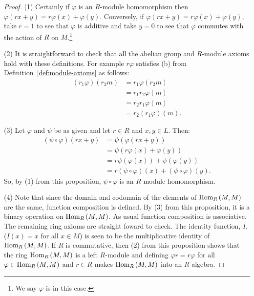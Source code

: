     \begin{proof}
        (1) Certainly if $\varphi$ is an $R$-module homomorphism then $\varphi(rx+y) = r\varphi(x) + \varphi(y)$. Conversely, if $\varphi(rx+y) = r\varphi(x) + \varphi(y)$, take $r = 1$ to see that $\varphi$ is additive and take $y = 0$ to see that $\varphi$ commutes with the action of $R$ on $M$.\footnote{We say $\varphi$ is  in this case.}

        (2) It is straightforward to check that all the abelian group and $R$-module axioms hold with these definitions. For example $r\varphi$ satisfies (b) from Definition~\ref{def:module-axioms} as follows:
            \begin{equation*}
            \begin{split}
                (r_1\varphi)(r_2 m)
                & = r_1 \varphi(r_2 m) \\
                & = r_1 r_2 \varphi(m) \\
                & = r_2 r_1 \varphi(m) \\
                & = r_2 (r_1\varphi)(m).
            \end{split}
            \end{equation*}

        (3) Let $\varphi$ and $\psi$ be as given and let $r \in R$ and $x,y \in L$. Then:
            \begin{equation*}
            \begin{split}
                (\psi \circ \varphi)(rx+y)
                & = \psi(\varphi(rx+y)) \\
                & = \psi(r\varphi(x) + \varphi(y)) \\
                & = r\psi(\varphi(x)) + \psi(\varphi(y)) \\
                & = r(\psi \circ \varphi)(x) + (\psi \circ \varphi)(y).
            \end{split}
            \end{equation*}
        So, by (1) from this proposition, $\psi \circ \varphi$ is an $R$-module homomorphism.

        (4) Note that since the domain and codomain of the elements of $\operatorname{Hom}_R{(M,M)}$ are the same, function composition is defined. By (3) from this proposition, it is a binary operation on $\operatorname{Hom}_R{(M,M)}$. As usual function composition is associative. The remaining ring axioms are straight foward to check. The identity function, $I$, ($I(x) = x$ for all $x \in M$) is seen to be the multiplicative identity of $\operatorname{Hom}_R{(M,M)}$. If $R$ is commutative, then (2) from this proposition shows that the ring $\operatorname{Hom}_R{(M,M)}$ is a left $R$-module and defining $\varphi r = r\varphi$ for all $\varphi \in \operatorname{Hom}_R{(M,M)}$ and $r \in R$ makes $\operatorname{Hom}_R{(M,M)}$ into an $R$-algebra.
    \end{proof}

